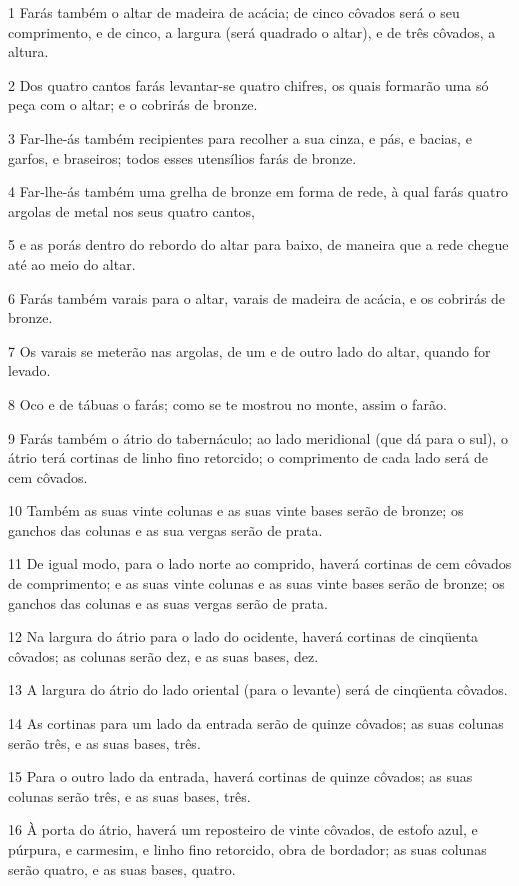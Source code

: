 \par 1 Farás também o altar de madeira de acácia; de cinco côvados será o seu comprimento, e de cinco, a largura (será quadrado o altar), e de três côvados, a altura.
\par 2 Dos quatro cantos farás levantar-se quatro chifres, os quais formarão uma só peça com o altar; e o cobrirás de bronze.
\par 3 Far-lhe-ás também recipientes para recolher a sua cinza, e pás, e bacias, e garfos, e braseiros; todos esses utensílios farás de bronze.
\par 4 Far-lhe-ás também uma grelha de bronze em forma de rede, à qual farás quatro argolas de metal nos seus quatro cantos,
\par 5 e as porás dentro do rebordo do altar para baixo, de maneira que a rede chegue até ao meio do altar.
\par 6 Farás também varais para o altar, varais de madeira de acácia, e os cobrirás de bronze.
\par 7 Os varais se meterão nas argolas, de um e de outro lado do altar, quando for levado.
\par 8 Oco e de tábuas o farás; como se te mostrou no monte, assim o farão.
\par 9 Farás também o átrio do tabernáculo; ao lado meridional (que dá para o sul), o átrio terá cortinas de linho fino retorcido; o comprimento de cada lado será de cem côvados.
\par 10 Também as suas vinte colunas e as suas vinte bases serão de bronze; os ganchos das colunas e as sua vergas serão de prata.
\par 11 De igual modo, para o lado norte ao comprido, haverá cortinas de cem côvados de comprimento; e as suas vinte colunas e as suas vinte bases serão de bronze; os ganchos das colunas e as suas vergas serão de prata.
\par 12 Na largura do átrio para o lado do ocidente, haverá cortinas de cinqüenta côvados; as colunas serão dez, e as suas bases, dez.
\par 13 A largura do átrio do lado oriental (para o levante) será de cinqüenta côvados.
\par 14 As cortinas para um lado da entrada serão de quinze côvados; as suas colunas serão três, e as suas bases, três.
\par 15 Para o outro lado da entrada, haverá cortinas de quinze côvados; as suas colunas serão três, e as suas bases, três.
\par 16 À porta do átrio, haverá um reposteiro de vinte côvados, de estofo azul, e púrpura, e carmesim, e linho fino retorcido, obra de bordador; as suas colunas serão quatro, e as suas bases, quatro.
